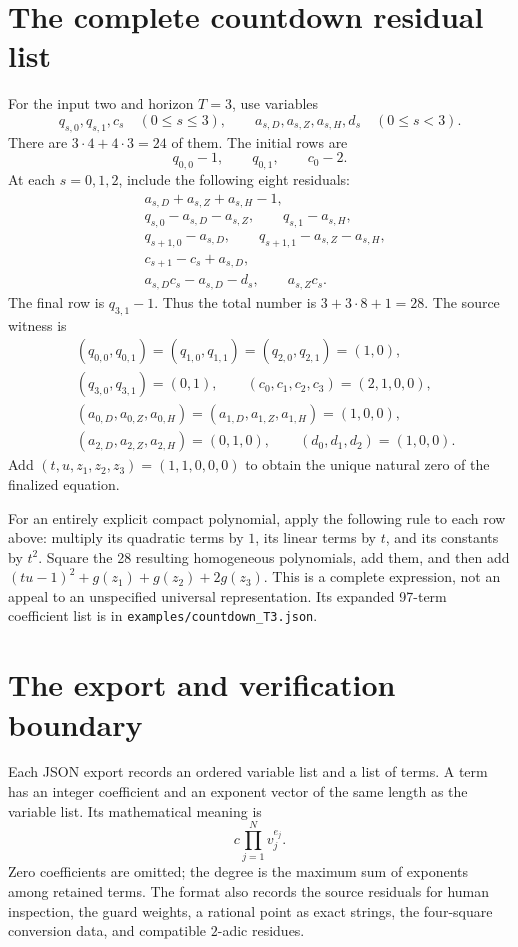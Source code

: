 \documentclass[11pt,a4paper]{article}
\theoremstyle{definition}
\theoremstyle{remark}
\newcommand{\guard}{g}
\begin{document}
\appendix
\section{The complete countdown residual list}\label{sdf:app:countdown}

For the input two and horizon $T=3$, use variables
\[
 q_{s,0},q_{s,1},c_s\quad(0\le s\le3),\qquad
 a_{s,D},a_{s,Z},a_{s,H},d_s\quad(0\le s<3).
\]
There are $3\cdot4+4\cdot3=24$ of them. The initial rows are
\[
 q_{0,0}-1,\qquad q_{0,1},\qquad c_0-2.
\]
At each $s=0,1,2$, include the following eight residuals:
\begin{align*}
 &a_{s,D}+a_{s,Z}+a_{s,H}-1,\\
 &q_{s,0}-a_{s,D}-a_{s,Z},\qquad q_{s,1}-a_{s,H},\\
 &q_{s+1,0}-a_{s,D},\qquad q_{s+1,1}-a_{s,Z}-a_{s,H},\\
 &c_{s+1}-c_s+a_{s,D},\\
 &a_{s,D}c_s-a_{s,D}-d_s,\qquad a_{s,Z}c_s.
\end{align*}
The final row is $q_{3,1}-1$. Thus the total number is $3+3\cdot8+1=28$.
The source witness is
\begin{align*}
 &(q_{0,0},q_{0,1})=(q_{1,0},q_{1,1})=(q_{2,0},q_{2,1})=(1,0),\\
 &(q_{3,0},q_{3,1})=(0,1),\qquad (c_0,c_1,c_2,c_3)=(2,1,0,0),\\
 &(a_{0,D},a_{0,Z},a_{0,H})=(a_{1,D},a_{1,Z},a_{1,H})=(1,0,0),\\
 &(a_{2,D},a_{2,Z},a_{2,H})=(0,1,0),\qquad(d_0,d_1,d_2)=(1,0,0).
\end{align*}
Add $(t,u,z_1,z_2,z_3)=(1,1,0,0,0)$ to obtain the unique natural zero of
the finalized equation.

For an entirely explicit compact polynomial, apply the following rule to
each row above: multiply its quadratic terms by $1$, its linear terms by
$t$, and its constants by $t^2$. Square the 28 resulting homogeneous
polynomials, add them, and then add $(tu-1)^2+\guard(z_1)+\guard(z_2)+
2\guard(z_3)$. This is a complete expression, not an appeal to an
unspecified universal representation. Its expanded 97-term coefficient
list is in \texttt{examples/countdown\_T3.json}.

\section{The export and verification boundary}\label{sdf:app:export}

Each JSON export records an ordered variable list and a list of terms.
A term has an integer coefficient and an exponent vector of the same
length as the variable list. Its mathematical meaning is
\[
 c\prod_{j=1}^Nv_j^{e_j}.
\]
Zero coefficients are omitted; the degree is the maximum sum of exponents
among retained terms. The format also records the source residuals for
human inspection, the guard weights, a rational point as exact strings,
the four-square conversion data, and compatible $2$-adic residues.
\end{document}
